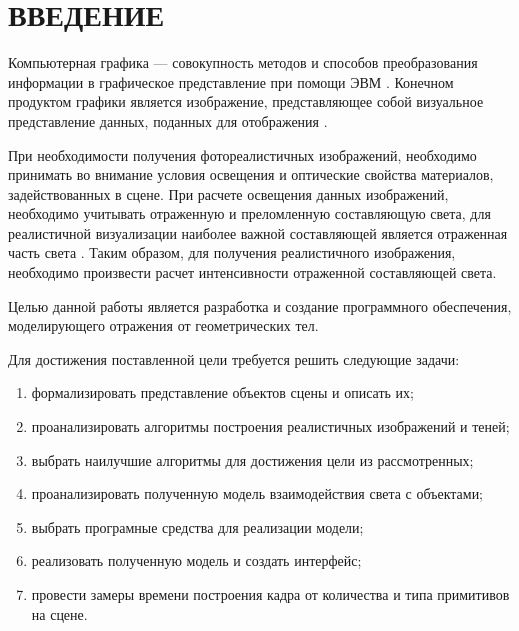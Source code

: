 \chapter*{ВВЕДЕНИЕ}


Компьютерная графика --- совокупность методов и способов преобразования информации в графическое представление при помощи ЭВМ \cite{compgraph_importance}.
Конечном продуктом графики является изображение, представляющее собой визуальное представление данных, поданных для отображения \cite{Rodgers}. 

При необходимости получения фотореалистичных изображений, необходимо принимать во внимание условия освещения и оптические свойства материалов, задействованных в сцене. При расчете освещения данных изображений, необходимо учитывать отраженную  и преломленную составляющую света, для реалистичной визуализации наиболее важной составляющей является отраженная часть света \cite{compgraph_usage,real_images}. Таким образом, для получения реалистичного изображения, необходимо произвести расчет интенсивности отраженной составляющей света.


Целью данной работы является разработка и создание программного обеспечения, моделирующего отражения от геометрических тел.

Для достижения поставленной цели требуется решить следующие задачи:
\begin{enumerate}
	\item формализировать представление объектов сцены и описать их;
	\item проанализировать алгоритмы построения реалистичных изображений и теней;
	\item выбрать наилучшие алгоритмы для достижения цели  из рассмотренных;
	\item проанализировать полученную  модель взаимодействия света с объектами;
	\item выбрать програмные средства для реализации модели;
	\item реализовать полученную модель и создать интерфейс;
	\item провести замеры времени построения кадра от количества и типа примитивов на сцене.
\end{enumerate}
